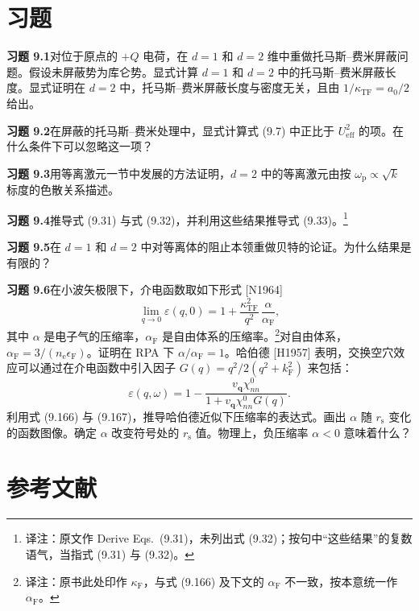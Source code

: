 \section*{习题}

\textbf{习题 9.1}\quad 对位于原点的 $+Q$ 电荷，在 $d=1$ 和 $d=2$ 维中重做托马斯–费米屏蔽问题。假设未屏蔽势为库仑势。显式计算 $d=1$ 和 $d=2$ 中的托马斯–费米屏蔽长度。显式证明在 $d=2$ 中，托马斯–费米屏蔽长度与密度无关，且由 $1/\kappa_{\mathrm{TF}}=a_{0}/2$ 给出。

\textbf{习题 9.2}\quad 在屏蔽的托马斯–费米处理中，显式计算式 (9.7) 中正比于 $U_{\mathrm{eff}}^{2}$ 的项。在什么条件下可以忽略这一项？

\textbf{习题 9.3}\quad 用等离激元一节中发展的方法证明，$d=2$ 中的等离激元由按 $\omega_{\mathrm{p}}\propto\sqrt{k}$ 标度的色散关系描述。

\textbf{习题 9.4}\quad 推导式 (9.31) 与式 (9.32)，并利用这些结果推导式 (9.33)。\footnote{译注：原文作 Derive Eqs.~(9.31)，未列出式 (9.32)；按句中“这些结果”的复数语气，当指式 (9.31) 与 (9.32)。}

\textbf{习题 9.5}\quad 在 $d=1$ 和 $d=2$ 中对等离体的阻止本领重做贝特的论证。为什么结果是有限的？

\textbf{习题 9.6}\quad 在小波矢极限下，介电函数取如下形式 [N1964]
\begin{equation*}
\lim_{q\to0}\varepsilon(q,0)=1+\frac{\kappa_{\mathrm{TF}}^{2}}{q^{2}}\,\frac{\alpha}{\alpha_{\mathrm{F}}},
\tag{9.166}
\end{equation*}
其中 $\alpha$ 是电子气的压缩率，$\alpha_{\mathrm{F}}$ 是自由体系的压缩率。\footnote{译注：原书此处印作 $\kappa_{\mathrm{F}}$，与式 (9.166) 及下文的 $\alpha_{\mathrm{F}}$ 不一致，按本意统一作 $\alpha_{\mathrm{F}}$。}对自由体系，$\alpha_{\mathrm{F}}=3/(n_{\mathrm{e}}\epsilon_{\mathrm{F}})$。证明在 RPA 下 $\alpha/\alpha_{\mathrm{F}}=1$。哈伯德 [H1957] 表明，交换空穴效应可以通过在介电函数中引入因子 $G(q)=q^{2}/2(q^{2}+k_{\mathrm{F}}^{2})$ 来包括：
\begin{equation*}
\varepsilon(q,\omega)=1-\frac{v_{\mathbf{q}}\chi_{nn}^{0}}{1+v_{\mathbf{q}}\chi_{nn}^{0}G(q)}.
\tag{9.167}
\end{equation*}
利用式 (9.166) 与 (9.167)，推导哈伯德近似下压缩率的表达式。画出 $\alpha$ 随 $r_{\mathrm{s}}$ 变化的函数图像。确定 $\alpha$ 改变符号处的 $r_{\mathrm{s}}$ 值。物理上，负压缩率 $\alpha<0$ 意味着什么？

\section*{参考文献}

